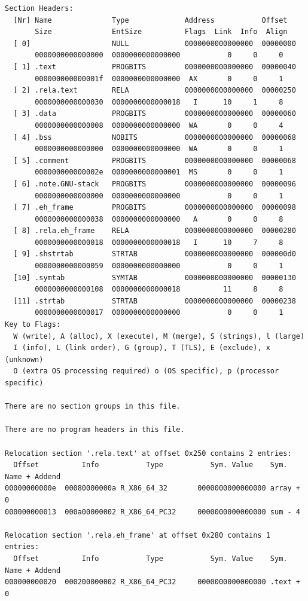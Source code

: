 \documentclass[11pt]{article}
\begin{document}
\begin{verbatim}
Section Headers:
  [Nr] Name              Type             Address           Offset
       Size              EntSize          Flags  Link  Info  Align
  [ 0]                   NULL             0000000000000000  00000000
       0000000000000000  0000000000000000           0     0     0
  [ 1] .text             PROGBITS         0000000000000000  00000040
       000000000000001f  0000000000000000  AX       0     0     1
  [ 2] .rela.text        RELA             0000000000000000  00000250
       0000000000000030  0000000000000018   I      10     1     8
  [ 3] .data             PROGBITS         0000000000000000  00000060
       0000000000000008  0000000000000000  WA       0     0     4
  [ 4] .bss              NOBITS           0000000000000000  00000068
       0000000000000000  0000000000000000  WA       0     0     1
  [ 5] .comment          PROGBITS         0000000000000000  00000068
       000000000000002e  0000000000000001  MS       0     0     1
  [ 6] .note.GNU-stack   PROGBITS         0000000000000000  00000096
       0000000000000000  0000000000000000           0     0     1
  [ 7] .eh_frame         PROGBITS         0000000000000000  00000098
       0000000000000038  0000000000000000   A       0     0     8
  [ 8] .rela.eh_frame    RELA             0000000000000000  00000280
       0000000000000018  0000000000000018   I      10     7     8
  [ 9] .shstrtab         STRTAB           0000000000000000  000000d0
       0000000000000059  0000000000000000           0     0     1
  [10] .symtab           SYMTAB           0000000000000000  00000130
       0000000000000108  0000000000000018          11     8     8
  [11] .strtab           STRTAB           0000000000000000  00000238
       0000000000000017  0000000000000000           0     0     1
Key to Flags:
  W (write), A (alloc), X (execute), M (merge), S (strings), l (large)
  I (info), L (link order), G (group), T (TLS), E (exclude), x (unknown)
  O (extra OS processing required) o (OS specific), p (processor specific)

There are no section groups in this file.

There are no program headers in this file.

Relocation section '.rela.text' at offset 0x250 contains 2 entries:
  Offset          Info           Type           Sym. Value    Sym. Name + Addend
00000000000e  00080000000a R_X86_64_32       0000000000000000 array + 0
000000000013  000a00000002 R_X86_64_PC32     0000000000000000 sum - 4

Relocation section '.rela.eh_frame' at offset 0x280 contains 1 entries:
  Offset          Info           Type           Sym. Value    Sym. Name + Addend
000000000020  000200000002 R_X86_64_PC32     0000000000000000 .text + 0


\end{verbatim}
\end{document}
